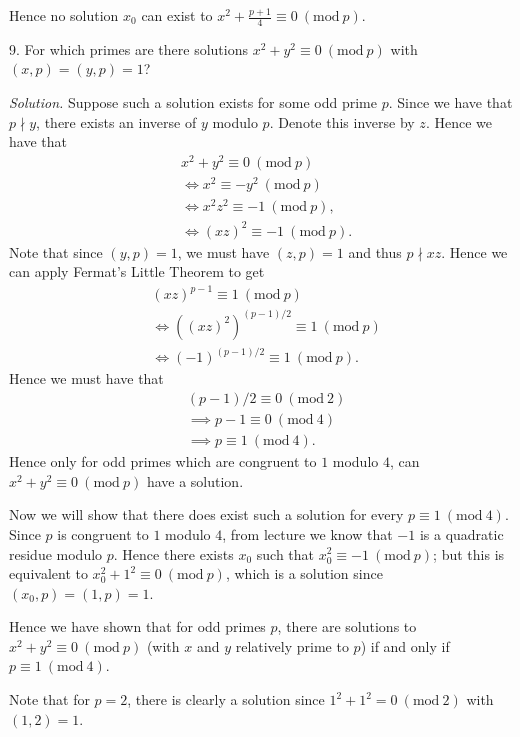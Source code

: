 \documentclass{article}
\newcommand{\Mod}[1]{\ (\mathrm{mod}\ #1)}
\begin{document}
Hence no solution $x_0$ can exist to $x^2 + \frac{p + 1}{4} \equiv 0 \Mod{p}$.

\newpage

9. For which primes are there solutions $x^2 + y^2 \equiv 0 \Mod{p}$
with $(x, p) = (y, p) = 1$?

\textit{Solution.}
Suppose such a solution exists for some odd prime $p$. Since we have that
$p \nmid y$, there exists an inverse of $y$ modulo $p$. Denote this
inverse by $z$. Hence we have that
%
\begin{align*}
    &x^2 + y^2 \equiv 0 \Mod{p} \\
    &\iff x^2 \equiv - y^2 \Mod{p} \\
    &\iff x^2 z^2 \equiv - 1 \Mod{p}, \\
    &\iff (xz)^2 \equiv - 1 \Mod{p}.
\end{align*}
%
Note that since $(y, p) = 1$, we must have $(z, p) = 1$ and thus
$p \nmid xz$. Hence we can apply Fermat's Little Theorem to get
%
\begin{align*}
    &(x z)^{p - 1} \equiv 1 \Mod{p} \\
    &\iff ((x z)^2)^{(p - 1) / 2} \equiv 1 \Mod{p} \\
    &\iff (-1)^{(p - 1) / 2} \equiv 1 \Mod{p}.
\end{align*}
%
Hence we must have that
%
\begin{align*}
    &(p - 1) / 2 \equiv 0 \Mod{2} \\
    &\implies p - 1 \equiv 0 \Mod{4} \\
    &\implies p \equiv 1 \Mod{4}.
\end{align*}
%
Hence only for odd primes which are congruent to $1$ modulo $4$,
can $x^2 + y^2 \equiv 0 \Mod{p}$ have a solution.

Now we will show that there does exist such a solution for every
$p \equiv 1 \Mod{4}$. Since $p$ is congruent to $1$ modulo $4$,
from lecture we know that $-1$ is a quadratic residue modulo $p$.
Hence there exists $x_0$ such that $x_0^2 \equiv - 1 \Mod{p}$;
but this is equivalent to $x_0^2 + 1^2 \equiv 0 \Mod{p}$,
which is a solution since $(x_0, p) = (1, p) = 1$.

Hence we have shown that for odd primes $p$, there are solutions to
$x^2 + y^2 \equiv 0 \Mod{p}$ (with $x$ and $y$ relatively prime to $p$)
if and only if $p \equiv 1 \Mod{4}$.

Note that for $p = 2$, there is clearly a solution since $1^2 + 1^2 = 0 \Mod{2}$
with $(1, 2) = 1$.

\newpage
\end{document}
